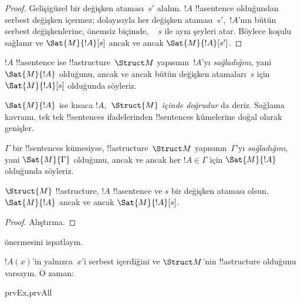 \begin{proof}
  Gelişigüzel bir değişken ataması~$s'$ alalım. $!A$ !!a{sentence}
  olduğundan serbest değişken içermez; dolayısıyla her değişken
  ataması~$s'$,~$!A$'nın bütün serbest değişkenlerine, önemsiz biçimde,
  ~ $s$ ile aynı şeyleri atar. Böylece  koşulu
  sağlanır ve $\Sat{M}{!A}[s]$ ancak ve ancak $\Sat{M}{!A}[s']$.
\end{proof}

\begin{defn}
$!A$ !!a{sentence} ise !!a{structure}~$\Struct M$ yapısının~$!A$'yı
\emph{sağladığını}, yani $\Sat{M}{!A}$ olduğunu, ancak ve ancak bütün
değişken atamaları~$s$ için $\Sat{M}{!A}[s]$ olduğunda söyleriz.
\end{defn}

$\Sat{M}{!A}$ ise kısaca \emph{$!A$,~$\Struct{M}$ içinde doğrudur} da
deriz. Sağlama kavramı, tek tek !!{sentence}s ifadelerinden
!!{sentence}s kümelerine doğal olarak genişler.

\begin{defn}
$\Gamma$ bir !!{sentence}s kümesiyse, !!a{structure}~$\Struct M$
yapısının~$\Gamma$'yı \emph{sağladığını}, yani $\Sat{M}{\Gamma}$
olduğunu, ancak ve ancak her $!A \in \Gamma$ için $\Sat{M}{!A}$
olduğunda söyleriz.
\end{defn}

\begin{prop}
  $\Struct{M}$ !!a{structure}, $!A$ !!a{sentence} ve $s$ bir değişken
  ataması olsun. $\Sat{M}{!A}$ ancak ve ancak $\Sat{M}{!A}[s]$.
\end{prop}

\begin{proof}
Alıştırma.
\end{proof}

\begin{prob}
 önermesini ispatlayın.
\end{prob}

\begin{prop}
  $!A(x)$'in yalnızca~$x$'i serbest içerdiğini ve $\Struct M$'nin
  !!a{structure} olduğunu varsayın. O zaman:
  \begin{tagenumerate}{prvEx,prvAll}
\end{tagenumerate}
\end{prop}

